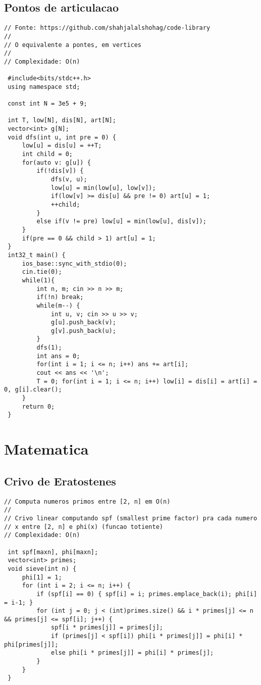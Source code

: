 \documentclass[11pt, a4paper, twoside]{article}
\begin{document}
\subsection{Pontos de articulacao}
\begin{lstlisting}
// Fonte: https://github.com/shahjalalshohag/code-library
//
// O equivalente a pontes, em vertices
//
// Complexidade: O(n)

 #include<bits/stdc++.h>
 using namespace std;
 
 const int N = 3e5 + 9;
 
 int T, low[N], dis[N], art[N];
 vector<int> g[N];
 void dfs(int u, int pre = 0) {
     low[u] = dis[u] = ++T;
     int child = 0;
     for(auto v: g[u]) {
         if(!dis[v]) {
             dfs(v, u);
             low[u] = min(low[u], low[v]);
             if(low[v] >= dis[u] && pre != 0) art[u] = 1;
             ++child;
         }
         else if(v != pre) low[u] = min(low[u], dis[v]);
     }
     if(pre == 0 && child > 1) art[u] = 1;
 }
 int32_t main() {
     ios_base::sync_with_stdio(0);
     cin.tie(0);
     while(1){
         int n, m; cin >> n >> m;
         if(!n) break;
         while(m--) {
             int u, v; cin >> u >> v;
             g[u].push_back(v);
             g[v].push_back(u);
         }
         dfs(1);
         int ans = 0;
         for(int i = 1; i <= n; i++) ans += art[i];
         cout << ans << '\n';
         T = 0; for(int i = 1; i <= n; i++) low[i] = dis[i] = art[i] = 0, g[i].clear();
     }
     return 0;
 }
\end{lstlisting}

\clearpage


%
%

\section{Matematica}

\subsection{Crivo de Eratostenes }
\begin{lstlisting}
// Computa numeros primos entre [2, n] em O(n) 
//
// Crivo linear computando spf (smallest prime factor) pra cada numero
// x entre [2, n] e phi(x) (funcao totiente)
// Complexidade: O(n)

 int spf[maxn], phi[maxn]; 
 vector<int> primes; 
 void sieve(int n) {
     phi[1] = 1; 
     for (int i = 2; i <= n; i++) {
         if (spf[i] == 0) { spf[i] = i; primes.emplace_back(i); phi[i] = i-1; }
         for (int j = 0; j < (int)primes.size() && i * primes[j] <= n && primes[j] <= spf[i]; j++) {
             spf[i * primes[j]] = primes[j]; 
             if (primes[j] < spf[i]) phi[i * primes[j]] = phi[i] * phi[primes[j]]; 
             else phi[i * primes[j]] = phi[i] * primes[j]; 
         } 
     } 
 } 
\end{lstlisting}
\end{document}
